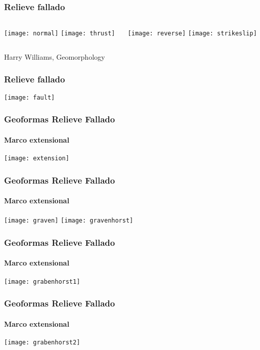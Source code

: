 \documentclass{beamer}
\begin{document}
\begin{frame}
\frametitle{Relieve fallado}
\centering
\begin{columns}
	\begin{column}{.5\linewidth}
	\texttt{[image: normal]}\vfill
	\texttt{[image: thrust]}
	\end{column}
	\begin{column}{.5\linewidth}
	\texttt{[image: reverse]}\vfill
	\texttt{[image: strikeslip]}
	\end{column}
\end{columns}
\tiny{Harry Williams, Geomorphology}
\end{frame}
\begin{frame}
\frametitle{Relieve fallado}
\begin{center}
\texttt{[image: fault]}
\end{center}
\end{frame}
\begin{frame}
\frametitle{Geoformas Relieve Fallado}
\framesubtitle{Marco extensional}
\begin{center}
\texttt{[image: extension]}
\end{center}
\end{frame}
\begin{frame}
\frametitle{Geoformas Relieve Fallado}
\framesubtitle{Marco extensional}
\begin{center}
\texttt{[image: graven]}\vfill
\texttt{[image: gravenhorst]}
\end{center}
\end{frame}
\begin{frame}
\frametitle{Geoformas Relieve Fallado}
\framesubtitle{Marco extensional}
\begin{center}
\texttt{[image: grabenhorst1]}
\end{center}
\end{frame}
\begin{frame}
\frametitle{Geoformas Relieve Fallado}
\framesubtitle{Marco extensional}
\begin{center}
\texttt{[image: grabenhorst2]}
\end{center}
\end{frame}
\end{document}
